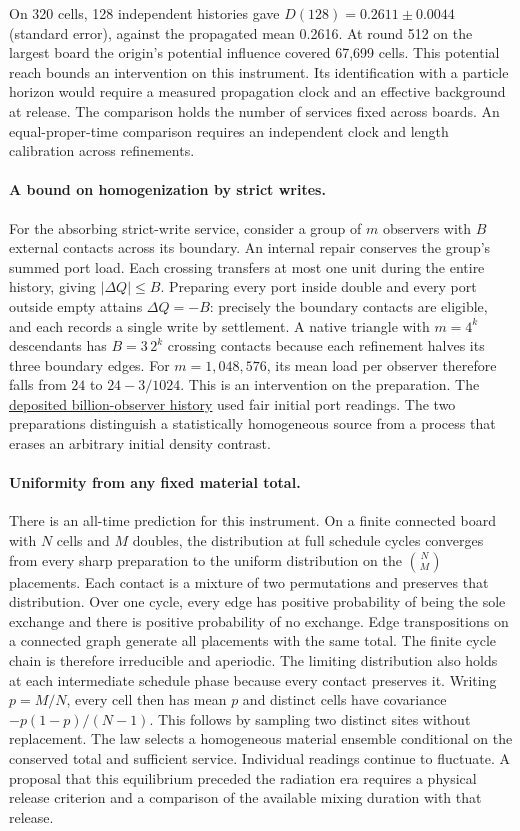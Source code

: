\documentclass[11pt]{article}
\theoremstyle{remark}
\theoremstyle{plain}
\begin{document}
On 320 cells, 128 independent histories gave $D(128)=0.2611\pm0.0044$
(standard error), against the propagated mean 0.2616. At round 512 on the
largest board the origin's potential influence covered 67,699 cells.
This potential reach bounds an intervention on this instrument. Its
identification with a particle horizon would require a measured propagation
clock and an effective background at release. The comparison holds the
number of services fixed across boards. An equal-proper-time comparison
requires an independent clock and length calibration across refinements.

\paragraph{A bound on homogenization by strict writes.}
For the absorbing strict-write service, consider a group of $m$ observers
with $B$ external contacts across its boundary. An internal repair conserves
the group's summed port load. Each crossing transfers at most one unit
during the entire history, giving $|\Delta Q|\le B$. Preparing every port
inside double and every port outside empty attains $\Delta Q=-B$:
precisely the boundary contacts are eligible, and each records a single
write by settlement. A native triangle with $m=4^k$ descendants has
$B=3\,2^k$ crossing contacts because each refinement halves its three
boundary edges. For $m=1{,}048{,}576$, its mean load per observer therefore
falls from $24$ to $24-3/1024$. This is an intervention on the preparation.
The \href{https://dovybzrnzxfo1.cloudfront.net/manifest.json}{deposited
billion-observer history} used fair initial port readings. The two
preparations distinguish a statistically homogeneous source from a process
that erases an arbitrary initial density contrast.

\paragraph{Uniformity from any fixed material total.}
There is an all-time prediction for this instrument. On a finite connected
board with $N$ cells and $M$ doubles, the distribution at full schedule
cycles converges from every sharp preparation to the uniform distribution
on the $\binom{N}{M}$ placements. Each contact is a mixture of two
permutations and preserves that distribution. Over one cycle, every edge
has positive probability of being the sole exchange and there is positive
probability of no exchange. Edge transpositions on a connected graph
generate all placements with the same total. The finite cycle chain is
therefore irreducible and aperiodic. The limiting distribution also
holds at each intermediate schedule phase because every contact preserves it.
Writing $p=M/N$, every cell then has mean $p$ and distinct cells have
covariance $-p(1-p)/(N-1)$. This follows by sampling two distinct sites
without replacement. The law selects a homogeneous material ensemble
conditional on the conserved total and sufficient service. Individual
readings continue to fluctuate. A proposal that this equilibrium preceded
the radiation era requires a physical release criterion and a comparison
of the available mixing duration with that release.
\end{document}

